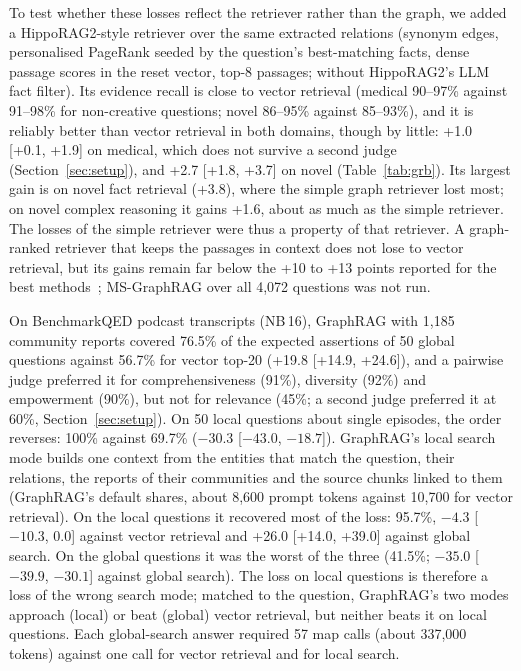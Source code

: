 \documentclass[11pt,a4paper]{article}
\newcommand{\nb}[1]{NB\,#1}
\begin{document}
To test whether these losses reflect the retriever rather than the graph, we added a HippoRAG2-style retriever over
the same extracted relations (synonym edges, personalised PageRank seeded by the question's best-matching facts,
dense passage scores in the reset vector, top-8 passages; without HippoRAG2's LLM fact filter). Its evidence recall
is close to vector retrieval (medical 90--97\% against 91--98\% for non-creative questions; novel 86--95\% against
85--93\%), and it is reliably better than vector retrieval in both domains, though by little: +1.0 [+0.1, +1.9] on
medical, which does not survive a second judge (Section~\ref{sec:setup}), and +2.7 [+1.8, +3.7] on novel
(Table~\ref{tab:grb}). Its largest gain is on novel fact retrieval (+3.8), where
the simple graph retriever lost most; on novel complex reasoning it gains +1.6, about as much as the simple retriever.
The losses of the simple retriever were thus a property of that retriever. A graph-ranked retriever that keeps the
passages in context does not lose to vector retrieval, but its gains remain far below the +10 to +13 points reported
for the best methods~\cite{xiang2025graphragbench}; MS-GraphRAG over all 4{,}072 questions was not run.

On BenchmarkQED podcast transcripts (\nb{16}), GraphRAG with 1{,}185 community reports covered 76.5\% of the
expected assertions of 50 global questions against 56.7\% for vector top-20 (+19.8 [+14.9, +24.6]), and a pairwise
judge preferred it for comprehensiveness (91\%), diversity (92\%) and empowerment (90\%), but not for relevance
(45\%; a second judge preferred it at 60\%, Section~\ref{sec:setup}). On 50 local questions about single episodes, the order reverses: 100\% against 69.7\% ($-30.3$ [$-43.0$,
$-18.7$]). GraphRAG's local search mode builds one context from the entities that
match the question, their relations, the reports of their communities and the source chunks linked to them
(GraphRAG's default shares, about 8{,}600 prompt tokens against 10{,}700 for vector retrieval). On the local questions
it recovered most of the loss: 95.7\%, $-4.3$ [$-10.3$, 0.0] against vector retrieval and +26.0 [+14.0, +39.0]
against global search. On the global questions it was the worst of the three (41.5\%; $-35.0$ [$-39.9$, $-30.1$]
against global search). The loss on local questions is therefore a loss of the wrong search mode; matched to the
question, GraphRAG's two modes approach (local) or beat (global) vector retrieval, but neither beats it on local
questions. Each global-search answer required 57 map calls (about 337{,}000 tokens) against one call for vector
retrieval and for local search.
\end{document}
